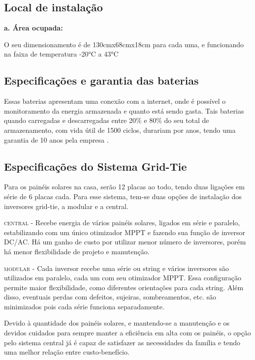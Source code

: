 \subsection{Local de instalação}

\textbf{a. Área ocupada:}

	O seu dimensionamento é de 130cmx68cmx18cm para cada uma, e funcionando na faixa de temperatura -20°C a 43°C \cite{TESLA}

\subsection{Especificações e garantia das baterias}

	Essas baterias apresentam uma conexão com a internet, onde é possível o monitoramento da energia armazenada e quanto está sendo gasta. Tais baterias quando carregadas e descarregadas entre 20\% e 80\% do seu total de armazenamento, com vida útil de 1500 ciclos, durariam por anos, tendo uma garantia de 10 anos pela empresa \cite{TESLA}.

\subsection{Especificações do Sistema Grid-Tie}

	Para os painéis solares na casa, serão 12 placas ao todo, tendo duas ligações em série de 6 placas cada. Para esse sistema, tem-se duas opções de instalação dos inversores grid-tie, a modular e a central.

	\textsc{central} - Recebe energia de vários painéis solares, ligados em série e paralelo, estabilizando com um único otimizador MPPT e fazendo sua função de inversor DC/AC. Há um ganho de custo por utilizar menor número de inversores, porém há menor flexibilidade de projeto e manutenção.

	\textsc{modular} - Cada inversor recebe uma série ou string e vários inversores são utilizados em paralelo, cada um com seu otimizador MPPT. Essa configuração permite maior flexibilidade, como diferentes orientações para cada string. Além disso, eventuais perdas com defeitos, sujeiras, sombreamentos, etc. são minimizados pois cada série funciona separadamente.

	Devido à quantidade dos painéis solares, e mantendo-se a manutenção e os devidos cuidados para sempre manter a eficiência em alta com os painéis, o opção pelo sistema central já é capaz de satisfazer as necessidades da família e tendo uma melhor relação entre custo-benefício.

